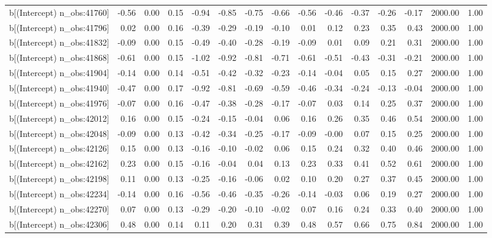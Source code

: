 \begin{table}[ht]
\begin{tabular}{rrrrrrrrrrrrrrr}
  b[(Intercept) n\_obs:41760] & -0.56 & 0.00 & 0.15 & -0.94 & -0.85 & -0.75 & -0.66 & -0.56 & -0.46 & -0.37 & -0.26 & -0.17 & 2000.00 & 1.00 \\ 
  b[(Intercept) n\_obs:41796] & 0.02 & 0.00 & 0.16 & -0.39 & -0.29 & -0.19 & -0.10 & 0.01 & 0.12 & 0.23 & 0.35 & 0.43 & 2000.00 & 1.00 \\ 
  b[(Intercept) n\_obs:41832] & -0.09 & 0.00 & 0.15 & -0.49 & -0.40 & -0.28 & -0.19 & -0.09 & 0.01 & 0.09 & 0.21 & 0.31 & 2000.00 & 1.00 \\ 
  b[(Intercept) n\_obs:41868] & -0.61 & 0.00 & 0.15 & -1.02 & -0.92 & -0.81 & -0.71 & -0.61 & -0.51 & -0.43 & -0.31 & -0.21 & 2000.00 & 1.00 \\ 
  b[(Intercept) n\_obs:41904] & -0.14 & 0.00 & 0.14 & -0.51 & -0.42 & -0.32 & -0.23 & -0.14 & -0.04 & 0.05 & 0.15 & 0.27 & 2000.00 & 1.00 \\ 
  b[(Intercept) n\_obs:41940] & -0.47 & 0.00 & 0.17 & -0.92 & -0.81 & -0.69 & -0.59 & -0.46 & -0.34 & -0.24 & -0.13 & -0.04 & 2000.00 & 1.00 \\ 
  b[(Intercept) n\_obs:41976] & -0.07 & 0.00 & 0.16 & -0.47 & -0.38 & -0.28 & -0.17 & -0.07 & 0.03 & 0.14 & 0.25 & 0.37 & 2000.00 & 1.00 \\ 
  b[(Intercept) n\_obs:42012] & 0.16 & 0.00 & 0.15 & -0.24 & -0.15 & -0.04 & 0.06 & 0.16 & 0.26 & 0.35 & 0.46 & 0.54 & 2000.00 & 1.00 \\ 
  b[(Intercept) n\_obs:42048] & -0.09 & 0.00 & 0.13 & -0.42 & -0.34 & -0.25 & -0.17 & -0.09 & -0.00 & 0.07 & 0.15 & 0.25 & 2000.00 & 1.00 \\ 
  b[(Intercept) n\_obs:42126] & 0.15 & 0.00 & 0.13 & -0.16 & -0.10 & -0.02 & 0.06 & 0.15 & 0.24 & 0.32 & 0.40 & 0.46 & 2000.00 & 1.00 \\ 
  b[(Intercept) n\_obs:42162] & 0.23 & 0.00 & 0.15 & -0.16 & -0.04 & 0.04 & 0.13 & 0.23 & 0.33 & 0.41 & 0.52 & 0.61 & 2000.00 & 1.00 \\ 
  b[(Intercept) n\_obs:42198] & 0.11 & 0.00 & 0.13 & -0.25 & -0.16 & -0.06 & 0.02 & 0.10 & 0.20 & 0.27 & 0.37 & 0.45 & 2000.00 & 1.00 \\ 
  b[(Intercept) n\_obs:42234] & -0.14 & 0.00 & 0.16 & -0.56 & -0.46 & -0.35 & -0.26 & -0.14 & -0.03 & 0.06 & 0.19 & 0.27 & 2000.00 & 1.00 \\ 
  b[(Intercept) n\_obs:42270] & 0.07 & 0.00 & 0.13 & -0.29 & -0.20 & -0.10 & -0.02 & 0.07 & 0.16 & 0.24 & 0.33 & 0.40 & 2000.00 & 1.00 \\ 
  b[(Intercept) n\_obs:42306] & 0.48 & 0.00 & 0.14 & 0.11 & 0.20 & 0.31 & 0.39 & 0.48 & 0.57 & 0.66 & 0.75 & 0.84 & 2000.00 & 1.00 \\ 

\end{tabular}
\end{table}
